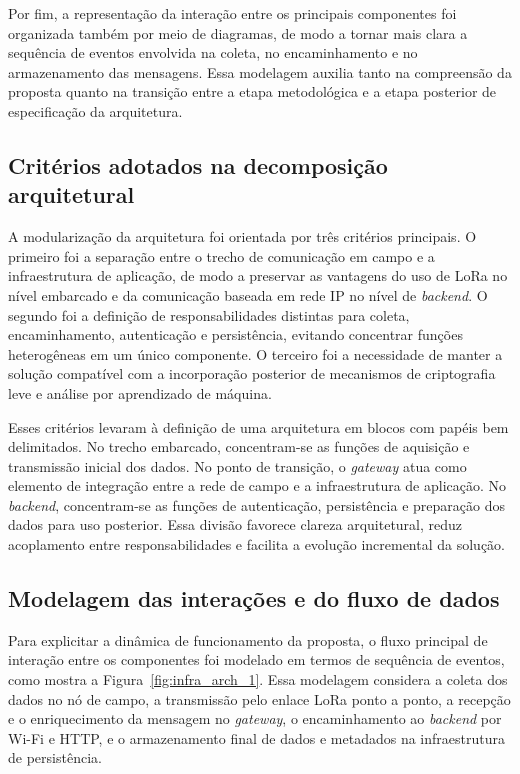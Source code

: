 Por fim, a representação da interação entre os principais componentes foi organizada também por meio de diagramas, de modo a tornar mais clara a sequência de eventos envolvida na coleta, no encaminhamento e no armazenamento das mensagens. Essa modelagem auxilia tanto na compreensão da proposta quanto na transição entre a etapa metodológica e a etapa posterior de especificação da arquitetura.

\subsection{Critérios adotados na decomposição arquitetural}

A modularização da arquitetura foi orientada por três critérios principais. O primeiro foi a separação entre o trecho de comunicação em campo e a infraestrutura de aplicação, de modo a preservar as vantagens do uso de LoRa no nível embarcado e da comunicação baseada em rede IP no nível de \textit{backend}. O segundo foi a definição de responsabilidades distintas para coleta, encaminhamento, autenticação e persistência, evitando concentrar funções heterogêneas em um único componente. O terceiro foi a necessidade de manter a solução compatível com a incorporação posterior de mecanismos de criptografia leve e análise por aprendizado de máquina.

Esses critérios levaram à definição de uma arquitetura em blocos com papéis bem delimitados. No trecho embarcado, concentram-se as funções de aquisição e transmissão inicial dos dados. No ponto de transição, o \textit{gateway} atua como elemento de integração entre a rede de campo e a infraestrutura de aplicação. No \textit{backend}, concentram-se as funções de autenticação, persistência e preparação dos dados para uso posterior. Essa divisão favorece clareza arquitetural, reduz acoplamento entre responsabilidades e facilita a evolução incremental da solução.

\subsection{Modelagem das interações e do fluxo de dados}

Para explicitar a dinâmica de funcionamento da proposta, o fluxo principal de interação entre os componentes foi modelado em termos de sequência de eventos, como mostra a Figura~\ref{fig:infra_arch_1}. Essa modelagem considera a coleta dos dados no nó de campo, a transmissão pelo enlace LoRa ponto a ponto, a recepção e o enriquecimento da mensagem no \textit{gateway}, o encaminhamento ao \textit{backend} por Wi-Fi e HTTP, e o armazenamento final de dados e metadados na infraestrutura de persistência.

